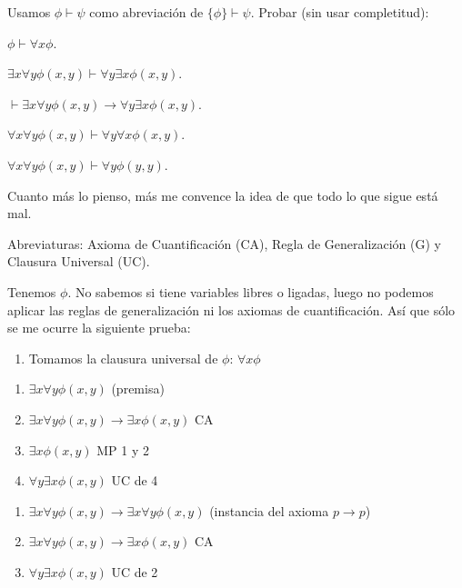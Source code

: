 \begin{problem}  Usamos $\phi \vdash \psi$ como abreviaci\'on de  $\{\phi\} \vdash \psi$.  Probar (sin usar completitud):

\ppart $ \phi  \vdash   \forall x \phi$.

\ppart  $\exists x \forall y \phi (x,y)  \vdash   \forall y \exists x \phi (x,y)$.

\ppart  $ \vdash  \exists x \forall y \phi (x,y)  \to \forall y \exists x \phi (x,y)$.

\ppart   $  \forall x \forall y \phi (x,y) \vdash   \forall y \forall x \phi (x,y)$.

\ppart   $  \forall x \forall y \phi (x,y) \vdash   \forall y \phi (y,y)$.

\solution

{\color{orange} Cuanto más lo pienso, más me convence la idea de que todo lo que sigue está mal.}

Abreviaturas: Axioma de Cuantificación (CA), Regla de Generalización (G) y Clausura Universal (UC).

\spart
Tenemos $\phi$. No sabemos si tiene variables libres o ligadas, luego no podemos aplicar las reglas de generalización ni los axiomas de cuantificación. Así que sólo se me ocurre la siguiente prueba:

\begin{enumerate}
	\item Tomamos la clausura universal de $\phi$: $\forall x \phi$
\end{enumerate}

\spart

\begin{enumerate}
	\item $\exists x \forall y \phi (x,y)$ (premisa)
	\item $\exists x \forall y \phi (x,y) \to \exists x \phi (x,y)$ CA
	\item $\exists x \phi (x,y)$ MP 1 y 2
	\item $\forall y \exists x \phi (x,y)$ UC de 4
\end{enumerate}

\spart

\begin{enumerate}
	\item $\exists x \forall y \phi (x,y)  \to \exists x \forall y \phi (x,y)$ (instancia del axioma $p \to p$)
	\item $ \exists x \forall y \phi (x,y)  \to \exists x \phi (x,y)$ CA
	\item $\forall y \exists x \phi (x,y)$ UC de 2
\end{enumerate}


\end{problem}

